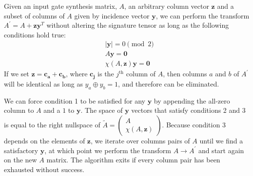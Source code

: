 \documentclass[a0,landscape]{a0poster}
\begin{document}
\begin{multicols}{3}
\begin{minipage}[b]{\linewidth}
\begin{tcolorbox}[title=\textcolor{white}{\huge\textbf{\textsf{Extended Lempel Algorithm}\textcolor{black}{y}}}]
\begin{multicols}{2}
				Given an input gate synthesis matrix, $A$, an arbitrary column vector $\mathbf{z}$ and a subset of columns of $A$ given by incidence vector $\mathbf{y}$, we can perform the transform $A^\prime = A + \mathbf{z}\mathbf{y}^T$ without altering the signature tensor as long as the following conditions hold true:
				\begin{align}
					&|\mathbf{y}| = 0 \pmod{2} \\
					&A\mathbf{y}=\mathbf{0} \\
					&\chi(A,\mathbf{z})\mathbf{y} = \mathbf{0}
				\end{align}
				If we set $\mathbf{z}=\mathbf{c_a}+\mathbf{c_b}$, where $\mathbf{c_j}$ is the $j^\text{th}$ column of $A$, then columns $a$ and $b$ of $A^\prime$ will be identical as long as $y_a \oplus y_b = 1$, and therefore can be eliminated.
				
				We can force condition 1 to be satisfied for any $\mathbf{y}$ by appending the all-zero column to $A$ and a $1$ to $\mathbf{y}$. The space of $\mathbf{y}$ vectors that satisfy conditions 2 and 3 is equal to the right nullspace of $\tilde{A}=\begin{pmatrix}
				A\\\chi(A,\mathbf{z})
				\end{pmatrix}$. Because condition 3 depends on the elements of $\mathbf{z}$, we iterate over columns pairs of $A$ until we find a satisfactory $\mathbf{y}$, at which point we perform the transform $A\rightarrow A^\prime$ and start again on the new $A$ matrix. The algorithm exits if every column pair has been exhausted without success.
								

\end{multicols}
\end{tcolorbox}
\end{minipage}
\end{multicols}
\end{document}
